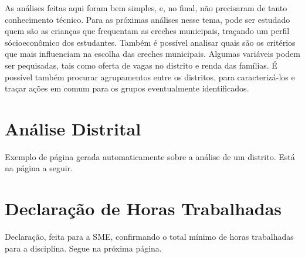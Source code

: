\documentclass[12pt, a4paper]{article}
\begin{document}
As análises feitas aqui foram bem simples, e, no final, não precisaram de tanto conhecimento técnico. Para as próximas análises nesse tema, pode ser estudado quem são as crianças que frequentam as creches municipais, traçando um perfil sócioeconômico dos estudantes. Também é possível analisar quais são os critérios que mais influenciam na escolha das creches municipais. Algumas variáveis podem ser pequisadas, tais como oferta de vagas no distrito e renda das famílias. É possível também procurar agrupamentos entre os distritos, para caracterizá-los e traçar ações em comum para os grupos eventualmente identificados. 

\clearpage

\appendix

\section{Análise Distrital}
\label{apend:page}

Exemplo de página gerada automaticamente sobre a análise de um distrito. Está na página a seguir.



\section{Declaração de Horas Trabalhadas}
\label{apend:dec}

Declaração, feita para a SME, confirmando o total mínimo de horas trabalhadas para a disciplina. Segue na próxima página.


\end{document}

